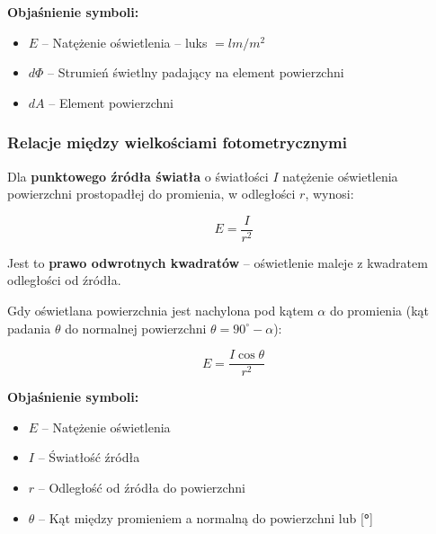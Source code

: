 \documentclass[12pt,a4paper]{article}
\newcommand{\oznaczenie}[2]{%
  \item $#1$ -- #2%
}
\begin{document}
\begin{objasnbox}
\textbf{Objaśnienie symboli:}
\begin{itemize}[leftmargin=2em]
  \oznaczenie{E}{Natężenie oświetlenia \quad [\textbf{lx}] -- luks $= \si{lm/m^2}$}
  \oznaczenie{d\Phi}{Strumień świetlny padający na element powierzchni \quad [\textbf{lm}]}
  \oznaczenie{dA}{Element powierzchni \quad [\textbf{m}$^2$]}
\end{itemize}
\end{objasnbox}

\subsubsection{Relacje między wielkościami fotometrycznymi}

Dla \textbf{punktowego źródła światła} o światłości $I$ natężenie oświetlenia
powierzchni prostopadłej do promienia, w odległości $r$, wynosi:

\begin{wzorbox}
\begin{equation}
  E = \frac{I}{r^2}
  \label{eq:prawo_odwrotnych_kwadratow}
\end{equation}
\end{wzorbox}

Jest to \textbf{prawo odwrotnych kwadratów} -- oświetlenie maleje z kwadratem
odległości od źródła.

Gdy oświetlana powierzchnia jest nachylona pod kątem $\alpha$ do promienia
(kąt padania $\theta$ do normalnej powierzchni $\theta = 90^\circ - \alpha$):

\begin{wzorbox}
\begin{equation}
  E = \frac{I \cos\theta}{r^2}
  \label{eq:lambert}
\end{equation}
\end{wzorbox}

\begin{objasnbox}
\textbf{Objaśnienie symboli:}
\begin{itemize}[leftmargin=2em]
  \oznaczenie{E}{Natężenie oświetlenia \quad [\textbf{lx}]}
  \oznaczenie{I}{Światłość źródła \quad [\textbf{cd}]}
  \oznaczenie{r}{Odległość od źródła do powierzchni \quad [\textbf{m}]}
  \oznaczenie{\theta}{Kąt między promieniem a normalną do powierzchni
                      \quad [\textbf{rad}] lub [\textbf{°}]}
\end{itemize}
\end{objasnbox}
\end{document}

